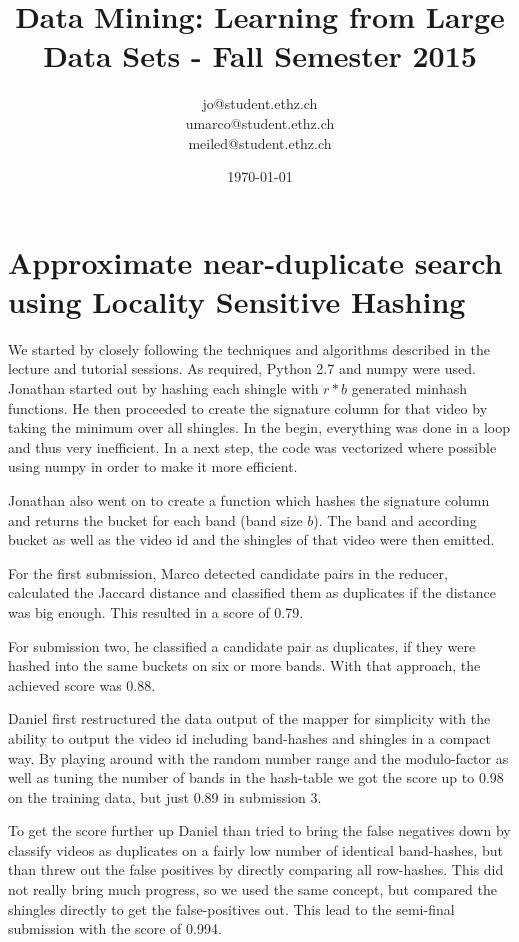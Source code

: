 \documentclass[a4paper, 11pt]{article}
\title{Data Mining: Learning from Large Data Sets - Fall Semester 2015}
\author{jo@student.ethz.ch\\ umarco@student.ethz.ch\\ meiled@student.ethz.ch\\}
\date{\today}
\begin{document}
\maketitle

\section*{Approximate near-duplicate search using Locality Sensitive Hashing}
We started by closely following the techniques and algorithms described in the lecture and tutorial sessions. As required, Python 2.7 and numpy were used.
Jonathan started out by hashing each shingle with $r * b$ generated minhash functions. He then proceeded to create the signature column for that video by taking the minimum over all shingles.
In the begin, everything was done in a loop and thus very inefficient. In a next step, the code was vectorized where possible using numpy in order to make it more efficient.

Jonathan also went on to create a function which hashes the signature column and returns the bucket for each band (band size $b$). The band and according bucket as well as the video id and the shingles of that video were then emitted.

For the first submission, Marco detected candidate pairs in the reducer, calculated the Jaccard distance and classified them as duplicates if the distance was big enough. This resulted in a score of 0.79.

For submission two, he classified a candidate pair as duplicates, if they were hashed into the same buckets on six or more bands. With that approach, the achieved score was 0.88.

Daniel first restructured the data output of the mapper for simplicity with the ability to output the video id including band-hashes and shingles in a compact way. By playing around with the random number range and the modulo-factor as well as tuning the number of bands in the hash-table we got the score up to 0.98 on the training data, but just 0.89 in submission 3.

To get the score further up Daniel than tried to bring the false negatives down by classify videos as duplicates on a fairly low number of identical band-hashes, but than threw out the false positives by directly comparing all row-hashes. This did not really bring much progress, so we used the same concept, but compared the shingles directly to get the false-positives out. This lead to the semi-final submission with the score of 0.994.
\end{document}
